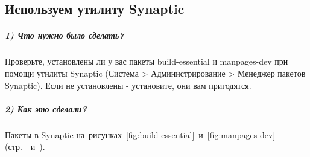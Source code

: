 \subsection{Используем утилиту Synaptic}

\subparagraph{1) Что нужно было сделать?}

Проверьте, установлены ли у вас пакеты build-essential и manpages-dev при помощи утилиты Synaptic (Система > Администрирование > Менеджер пакетов Synaptic). Если не установлены - установите, они вам пригодятся.

\subparagraph{2) Как это сделали?}


Пакеты в Synaptic на~рисунках~\ref{fig:build-essential}~и~\ref{fig:manpages-dev}
(стр.~\pageref{fig:build-essential}~и~\pageref{fig:manpages-dev}).

